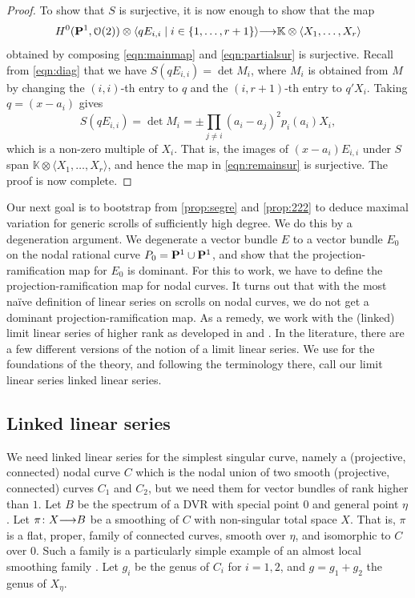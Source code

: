 \documentclass[11pt,reqno]{amsart}
\theoremstyle{plain}
\theoremstyle{definition}
\theoremstyle{remark}
\numberwithin{equation}{section}
\renewcommand{\k}{\mathbb{K}}
\renewcommand{\to}{{\longrightarrow}}
\numberwithin{equation}{section}
\renewcommand{\O}{\mathcal O}
\begin{document}
\begin{proof}
  To show that $S$ is surjective, it is now enough to show that the map
  \begin{equation}\label{eqn:remainsur}
    H^0(\P^1, \O(2)) \otimes \langle  qE_{i,i} \mid i \in \{1, \dots, r+1\} \rangle \to \k \otimes \langle  X_1, \dots, X_r \rangle
  \end{equation}
  obtained by composing \eqref{eqn:mainmap} and \eqref{eqn:partialsur} is surjective.
  Recall from \eqref{eqn:diag} that we have $S(qE_{i,i}) = \det M_i$, where $M_i$ is obtained from $M$ by changing the $(i,i)$-th entry to $q$ and the $(i, r+1)$-th entry to $q'X_i$.
  Taking $q = (x-a_i)$ gives
  \[ S(qE_{i,i}) = \det M_i = \pm \prod_{j \neq i} (a_i-a_j)^2 p_i(a_i) X_i,\]
  which is a non-zero multiple of $X_i$.
  That is, the images of $(x-a_i)E_{i,i}$ under $S$ span $\k \otimes \langle  X_1, \dots, X_r \rangle$, and hence the map in \eqref{eqn:remainsur} is surjective.
  The proof is now complete.
\end{proof}

Our next goal is to bootstrap from \autoref{prop:segre} and \autoref{prop:222} to deduce maximal variation for generic scrolls of sufficiently high degree.
We do this by a degeneration argument.
We degenerate a vector bundle $E$ to a vector bundle $E_0$ on the nodal rational curve $P_0 = \P^1 \cup \P^1$, and show that the projection-ramification map for $E_0$ is dominant.
For this to work, we have to define the projection-ramification map for nodal curves.
It turns out that with the most na\"ive definition of linear series on scrolls on nodal curves, we do not get a dominant projection-ramification map.
As a remedy, we work with the (linked) limit linear series of higher rank as developed in \cite{tei-i-big:91} and \cite{oss:14}.
In the literature, there are a few different versions of the notion of a limit linear series.
We use \cite{oss:14} for the foundations of the theory, and following the terminology there, call our limit linear series linked linear series.

\subsection{Linked linear series}\label{sec:lls}
We need linked linear series for the simplest singular curve, namely a (projective, connected) nodal curve $C$ which is the nodal union of two smooth (projective, connected) curves $C_1$ and $C_2$, but we need them for vector bundles of rank higher than $1$.
Let $B$ be the spectrum of a DVR with special point $0$ and general point $\eta$.
Let $\pi \from X \to B$ be a smoothing of $C$ with non-singular total space $X$.
That is, $\pi$ is a flat, proper, family of connected curves, smooth over $\eta$, and isomorphic to $C$ over $0$.
Such a family is a particularly simple example of an almost local smoothing family \cite[\S~2.1--2.2]{oss:14}.
Let $g_i$ be the genus of $C_i$ for $i = 1, 2$, and $g = g_1+g_2$ the genus of $X_\eta$.
\end{document}
